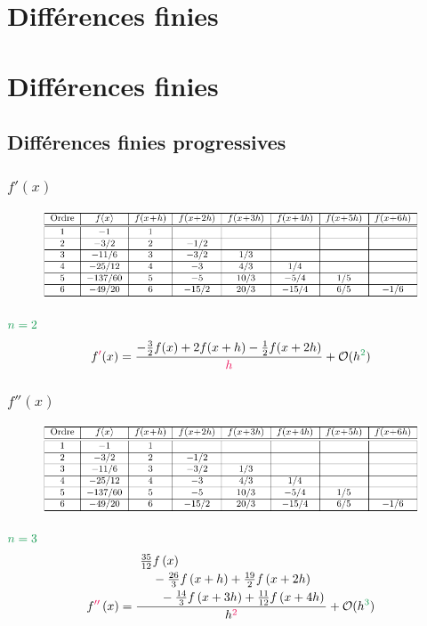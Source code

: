 \documentclass[resume]{subfiles}
\begin{document}
\section{Différences finies}
\section{Différences finies}
\subsection{Différences finies progressives}
\subsubsection{$f'(x)$}
\begin{figure}[H]
\centering
\includegraphics[width=\columnwidth,page=1]{diff_finies_tableaux.pdf}
\end{figure}
$\textcolor{ForestGreen}{n=2}$
$$f\textcolor{OrangeRed}{'}(x)=\frac{-\frac{3}{2}f(x)+2f(x+h)-\frac{1}{2}f(x+2h)}{\textcolor{OrangeRed}{h}}+\mathcal{O}(h^{\textcolor{ForestGreen}{2}})$$
\subsubsection{$f''(x)$}
\begin{figure}[H]
\centering
\includegraphics[width=\columnwidth,page=2]{diff_finies_tableaux.pdf}
\end{figure}
$\textcolor{ForestGreen}{n=3}$
$$f\textcolor{OrangeRed}{''}\left(x\right)=\frac{\splitdfrac{\splitdfrac{\frac{35}{12}f\left(x\right)}{-\frac{26}{3}f\left(x+h\right)+\frac{19}{2}f\left(x+2h\right)}}{-\frac{14}{3}f\left(x+3h\right)+\frac{11}{12}f\left(x+4h\right)}}{h^{\textcolor{OrangeRed}{2}}}+\mathcal{O}(h^{\textcolor{ForestGreen}{3}})$$
\end{document}

